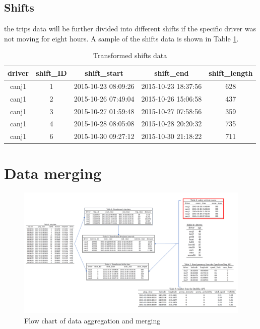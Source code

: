 \documentclass[12pt]{book}
\numberwithin{equation}{chapter}
\begin{document}
\hypertarget{shifts}{%
\subsection{Shifts}\label{shifts}}

the trips data will be further divided into different shifts if the specific driver was not moving for eight hours. A sample of the shifts data is shown in Table \ref{tab:transformshift}.

\begin{table}[H]

\caption{\label{tab:transformshift}Transformed shifts data}
\centering
\begin{tabular}{ccccc}
\toprule
driver & shift\_ID & shift\_start & shift\_end & shift\_length\\
\midrule
canj1 & 1 & 2015-10-23 08:09:26 & 2015-10-23 18:37:56 & 628\\
canj1 & 2 & 2015-10-26 07:49:04 & 2015-10-26 15:06:58 & 437\\
canj1 & 3 & 2015-10-27 01:59:48 & 2015-10-27 07:58:56 & 359\\
canj1 & 4 & 2015-10-28 08:05:08 & 2015-10-28 20:20:32 & 735\\
canj1 & 6 & 2015-10-30 09:27:12 & 2015-10-30 21:18:22 & 711\\
\bottomrule
\end{tabular}
\end{table}

\hypertarget{data-merging}{%
\section{Data merging}\label{data-merging}}

\begin{figure}[!ht]

{\centering \includegraphics[width=\linewidth]{figs/Data_merging} 

}

\caption{Flow chart of data aggregation and merging}\label{fig:datamerge}
\end{figure}
\end{document}
